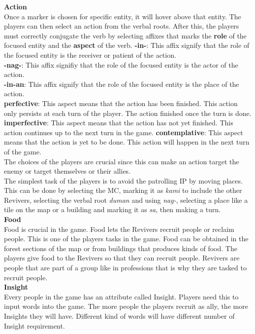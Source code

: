 \documentclass[11pt]{article}
\begin{document}
\textbf{Action}\\
Once a marker is chosen for specific entity, it will hover above that entity. The players can then select an action from the verbal roots. After this, the players must correctly conjugate the verb by selecting affixes that marks the \textbf{role} of the focused entity and the \textbf{aspect} of the verb.
\textbf{-in-}: This affix signify that the role of the focused entity is the receiver or patient of the action.\\
\textbf{-nag-}: This affix signifiy that the role of the focused entity is the actor of the action.\\
\textbf{-in-an}: This affix signify that the role of the focused entity is the place of the action.\\
\textbf{perfective}: This aspect means that the action has been finished. This action only persists at each turn of the player. The action finished once the turn is done.
\textbf{imperfective}: This aspect means that the action has not yet finished. This action continues up to the next turn in the game.
\textbf{contemplative}: This aspect means that the action is yet to be done. This action will happen in the next turn of the game.\\
The choices of the players are crucial since this can make an action target the enemy or target themselves or their allies.\\

The simplest task of the players is to avoid the patrolling IP by moving places. This can be done by selecting the MC, marking it as \textit{kami} to include the other Revivers, selecting the verbal root \textit{duman} and using \textit{nag-}, selecting a place like a tile on the map or a building and marking it as \textit{sa}, then making a turn.\\

\textbf{Food}\\
Food is crucial in the game. Food lets the Revivers recruit people or reclaim people. This is one of the players tasks in the game. Food can be obtained in the forest sections of the map or from buildings that produces kinds of food. The players give food to the Revivers so that they can recruit people. Revivers are people that are part of a group like in professions that is why they are tasked to recruit people.\\

\textbf{Insight}\\
Every people in the game has an attribute called Insight. Players need this to input words into the game. The more people the players recruit as ally, the more Insights they will have. Different kind of words will have different number of Insight requirement.\\
\end{document}
